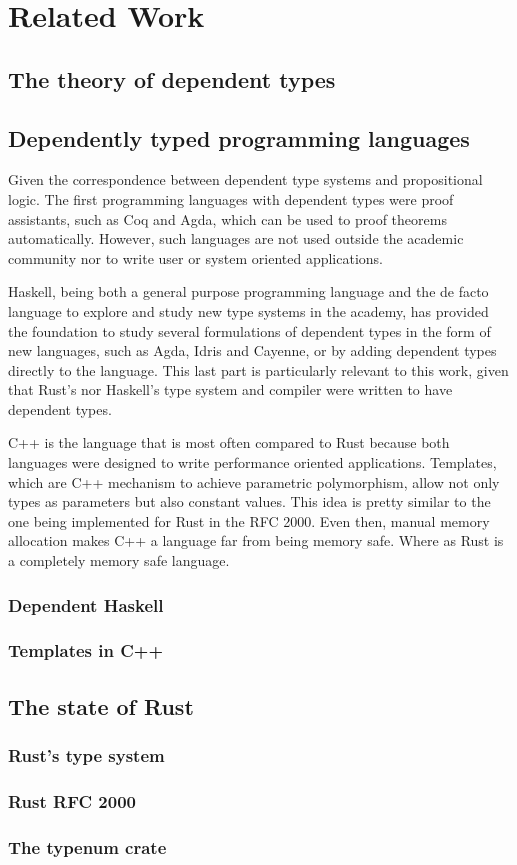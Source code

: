 \chapter{Related Work}
\label{chapter:related_work}

\section{The theory of dependent types}

\section{Dependently typed programming languages}

Given the correspondence between dependent type systems and propositional logic.
The first programming languages with dependent types were proof assistants, such
as Coq and Agda, \cite{agda} which can be used to proof theorems automatically. 
However, such languages are not used outside the academic community nor to write 
user or system oriented applications.

Haskell, being both a general purpose programming language and the de facto
language to explore and study new type systems in the academy, has provided the
foundation to study several formulations of dependent types in the form of new
languages, such as Agda, Idris \cite{idris} and Cayenne, \cite{cayenne} or by 
adding dependent types directly to the language. This last part is particularly
relevant to this work, given that Rust's nor Haskell's type system and compiler 
were written to have dependent types.

C++ is the language that is most often compared to Rust because both languages
were designed to write performance oriented applications. Templates, which are
C++ mechanism to achieve parametric polymorphism, allow not only types as
parameters but also constant values. \cite{templates} This idea is pretty 
similar to the one being implemented for Rust in the RFC 2000. Even then, 
manual memory allocation makes C++ a language far from being memory safe. 
Where as Rust is a completely memory safe language.    

\subsection{Dependent Haskell}

\subsection{Templates in C++}

\section{The state of Rust}
\subsection{Rust's type system}
\subsection{Rust RFC 2000}
\subsection{The typenum crate}
